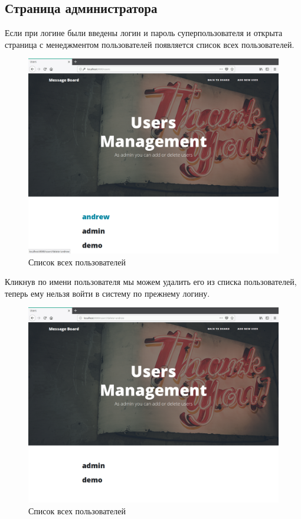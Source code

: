 \documentclass{article}
\begin{document}
	\subsection{Страница администратора}
	Если при логине были введены логин и пароль суперпользователя и открыта страница с менеджментом пользователей появляется список всех пользователей.
    \begin{figure}[H]
        \begin{flushleft}
            \centerline{\includegraphics[scale=0.3]{admin.png}}
            \caption{Список всех пользователей}
        \end{flushleft}
    \end{figure}
    
    Кликнув по имени пользователя мы можем удалить его из списка пользователей, теперь ему нельзя войти в систему по прежнему логину.
    \begin{figure}[H]
        \begin{flushleft}
            \centerline{\includegraphics[scale=0.3]{deleteuser.png}}
            \caption{Список всех пользователей}
        \end{flushleft}
    \end{figure}
\end{document}
